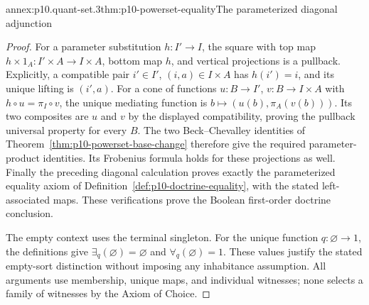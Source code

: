 \begin{annexitem}{annex:p10.quant-set.3}{thm:p10-powerset-equality}{The parameterized diagonal adjunction}
\begin{proof}
For a parameter substitution \(h:I'\to I\), the square with
top map \(h\times1_A:I'\times A\to I\times A\), bottom map
\(h\), and vertical projections is a pullback.
Explicitly, a compatible pair \(i'\in I'\), \((i,a)\in I\times A\)
has \(h(i')=i\), and its unique lifting is \((i',a)\).
For a cone of functions \(u:B\to I'\), \(v:B\to I\times A\)
with \(h\circ u=\pi_I\circ v\), the unique mediating function
is \(b\mapsto(u(b),\pi_A(v(b)))\).  Its two composites are
\(u\) and \(v\) by the displayed compatibility, proving the
pullback universal property for every \(B\).
The two Beck--Chevalley identities of
Theorem~\ref{thm:p10-powerset-base-change} therefore give the
required parameter-product identities.  Its Frobenius
formula holds for these projections as well.
Finally the preceding diagonal calculation proves exactly
the parameterized equality axiom of
Definition~\ref{def:p10-doctrine-equality}, with the stated
left-associated maps.  These verifications prove the
Boolean first-order doctrine conclusion.

The empty context uses the terminal singleton.
For the unique function \(q:\varnothing\to1\), the definitions
give \(\exists_q(\varnothing)=\varnothing\) and
\(\forall_q(\varnothing)=1\).  These values justify the
stated empty-sort distinction without imposing any
inhabitance assumption.  All arguments use membership,
unique maps, and individual witnesses; none selects a
family of witnesses by the Axiom of Choice.
\end{proof}
\end{annexitem}
